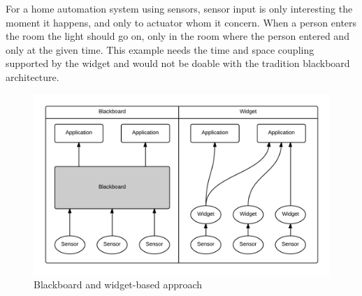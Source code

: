 \documentclass[../report.tex]{subfiles}
\begin{document}
For a home automation system using sensors, sensor input is only interesting the moment it happens, and only to actuator whom it concern. When a person enters the room the light should go on, only in the room where the person entered and only at the given time. This example needs the time and space coupling supported by the widget and would not be doable with the tradition blackboard architecture.

\begin{figure}
\centering
\includegraphics[width=\linewidth]{blackboard-widget.png}
\caption{Blackboard and widget-based approach}
\label{fig:blackboard-widget}
\end{figure}
\end{document}
